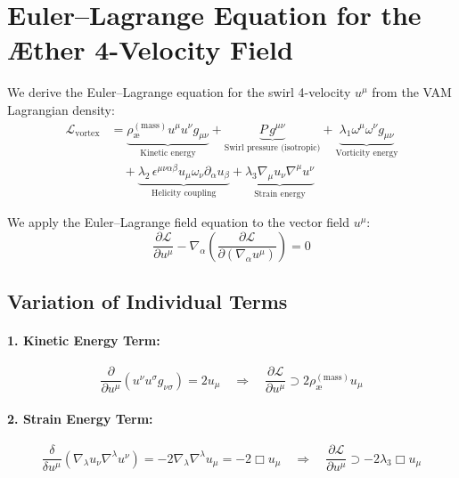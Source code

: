 \documentclass[twocolumn,aps,pre,floatfix,nofootinbib]{revtex4-2}
\begin{document}
    \section*{Euler--Lagrange Equation for the Æther 4-Velocity Field}

    We derive the Euler--Lagrange equation for the swirl 4-velocity \( u^\mu \) from the VAM Lagrangian density:
    \begin{align}
        \mathcal{L}_{\text{vortex}} &=
        \underbrace{\rho_{\text{\ae}}^{(\text{mass})} u^\mu u^\nu g_{\mu\nu}}_{\text{Kinetic energy}} +
        \underbrace{P\, g^{\mu\nu}}_{\text{Swirl pressure (isotropic)}} +
        \underbrace{\lambda_1 \omega^\mu \omega^\nu g_{\mu\nu}}_{\text{Vorticity energy}} \nonumber \\
        &\quad +
        \underbrace{\lambda_2\, \epsilon^{\mu\nu\alpha\beta} u_\mu \omega_\nu \partial_\alpha u_\beta}_{\text{Helicity coupling}} +
        \underbrace{\lambda_3 \nabla_\mu u_\nu \nabla^\mu u^\nu}_{\text{Strain energy}} \label{eq:VAM_Lagrangian}
    \end{align}

    We apply the Euler--Lagrange field equation to the vector field \( u^\mu \):
    \begin{equation}
        \frac{\partial \mathcal{L}}{\partial u^\mu}
        - \nabla_\alpha \left( \frac{\partial \mathcal{L}}{\partial(\nabla_\alpha u^\mu)} \right) = 0
    \end{equation}

    \subsection*{Variation of Individual Terms}

    \paragraph{1. Kinetic Energy Term:}
    \[
        \frac{\partial}{\partial u^\mu} \left( u^\nu u^\sigma g_{\nu\sigma} \right)
        = 2 u_\mu
        \quad \Rightarrow \quad
        \frac{\partial \mathcal{L}}{\partial u^\mu} \supset 2 \rho_{\text{\ae}}^{(\text{mass})} u_\mu
    \]

    \paragraph{2. Strain Energy Term:}
    \[
        \frac{\delta}{\delta u^\mu} \left( \nabla_\lambda u_\nu \nabla^\lambda u^\nu \right)
        = -2 \nabla_\lambda \nabla^\lambda u_\mu = -2 \Box u_\mu
        \quad \Rightarrow \quad
        \frac{\partial \mathcal{L}}{\partial u^\mu} \supset -2 \lambda_3 \Box u_\mu
    \]
\end{document}

